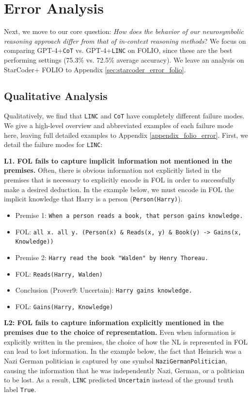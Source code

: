 \documentclass[11pt]{article}
\begin{document}
\section{Error Analysis}
\label{sec:error_analysis}
Next, we move to our core question: \textit{How does the behavior of our neurosymbolic reasoning approach differ from that of in-context reasoning methods}?
We focus on comparing GPT-4+\texttt{CoT} vs. GPT-4+\texttt{LINC} on FOLIO, since these are the best performing settings (75.3\% vs. 72.5\% average accuracy). We leave an analysis on StarCoder+ FOLIO to Appendix \ref{sec:starcoder_error_folio}.

\subsection{Qualitative Analysis} \label{sec:error_qualitative}
Qualitatively, we find that \texttt{LINC} and \texttt{CoT} have completely different failure modes. We give a high-level overview and abbreviated examples of each failure mode here, leaving full detailed examples to Appendix \ref{appendix_folio_error}. First, we detail the failure modes for \texttt{LINC}:

\textbf{L1. FOL fails to capture implicit information not mentioned in the premises.} Often, there is obvious information not explicitly listed in the premises that is necessary to explicitly encode in FOL in order to successfully make a desired deduction. In the example below, we must encode in FOL the implicit knowledge that Harry is a person (\texttt{Person(Harry)}).

\begin{itemize}[leftmargin=*]
\itemsep0.1em
    \item[] \small Premise 1: \texttt{When a person reads a book, that person gains knowledge.}
    \item[] \small FOL: \texttt{all x. all y. (Person(x) \& Reads(x, y) \& Book(y) -> Gains(x, Knowledge))}
    \item[] \small Premise 2: \texttt{Harry read the book "Walden" by Henry Thoreau.}
    \item[] \small FOL: \texttt{Reads(Harry, Walden)}
    \item[] \small Conclusion (Prover9: Uncertain): \texttt{Harry gains knowledge.}
    \item[] \small FOL: \texttt{Gains(Harry, Knowledge)}
\end{itemize}


\textbf{L2: FOL fails to capture information explicitly mentioned in the premises due to the choice of representation.} Even when information is explicitly written in the premises, the choice of how the NL is represented in FOL can lead to lost information. In the example below, the fact that Heinrich was a Nazi German politician is captured by one symbol \texttt{NaziGermanPolitician}, causing the information that he was independently Nazi, German, or a politician to be lost.
As a result, \texttt{LINC} predicted \texttt{Uncertain} instead of the ground truth label \texttt{True}.
\end{document}
